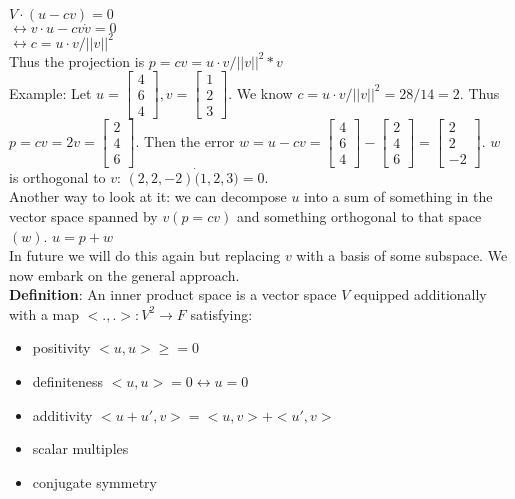 \documentclass{article}
\begin{document}
$V \cdot (u - cv) = 0$\\
$\leftrightarrow v\cdot u - cv \dot v = 0$\\
$\leftrightarrow c = u\cdot v/||v||^2$\\
Thus the projection is $ p = cv = u \cdot v/{||v||^2} * v$\\
Example: Let $ u = \begin{bmatrix}
4\\6\\4
\end{bmatrix}, v = \begin{bmatrix}
    1\\2\\3
\end{bmatrix}$. We know $c = u \cdot v/||v||^2 = 28/14 = 2$. Thus $p = cv = 2v = \begin{bmatrix}
    2\\4\\6
\end{bmatrix}$. Then the error $w = u -cv = \begin{bmatrix}
    4\\6\\4
\end{bmatrix} - \begin{bmatrix}
    2\\4\\6
\end{bmatrix} = \begin{bmatrix}
    2\\2\\-2
\end{bmatrix}$. $w$ is orthogonal to $v$: $(2,2,-2) \dot (1,2,3) = 0$. \\
Another way to look at it: we can decompose $u$ into a sum of something in the vector space spanned by $v (p=cv)$ and something orthogonal to that space $(w)$. $u = p+w $\\
In future we will do this again but replacing $v$ with a basis of some subspace. We now embark on the general approach. \\
\textbf{Definition}: An inner product space is a vector space $V$ equipped additionally with a map $< ., .> : V^2 \rightarrow F$ satisfying: 
\begin{itemize}
    \item positivity $<u,u> \geq = 0$
    \item definiteness $<u,u> = 0 \leftrightarrow u = 0$
    \item additivity $<u + u', v> = <u, v> + <u', v>$
    \item scalar multiples 
    \item conjugate symmetry 
\end{itemize}
\end{document}
